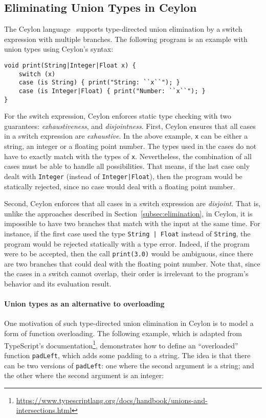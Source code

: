 \subsection{Eliminating Union Types in Ceylon}

The Ceylon language~\cite{king2013ceylon} supports type-directed union elimination by a
switch expression with multiple branches. The following program is an example
with union types using Ceylon's syntax:

\begin{lstlisting}
void print(String|Integer|Float x) {
	switch (x)
	case (is String) { print("String: ``x``"); }
	case (is Integer|Float) { print("Number: ``x``"); }
}
\end{lstlisting}
%

For the switch expression, Ceylon enforces static type checking with two
guarantees: \textit{exhaustiveness}, and \textit{disjointness}. First, Ceylon
ensures that all cases in a switch expression are \textit{exhaustive}. In the above
example, \lstinline{x} can be either a string, an integer or a floating point
number. The types used in the cases do not have to exactly match with the types
of \lstinline{x}. Nevertheless, the combination of all cases must be able to
handle all possibilities. That means, if the last case only dealt with
\lstinline{Integer} (instead of \lstinline{Integer|Float}), then the program
would be statically rejected, since no case would deal with a floating point
number.

Second, Ceylon enforces that all cases in a switch expression are
\textit{disjoint}. That is, unlike the approaches described in
Section~\ref{subsec:elimination}, in Ceylon, it is impossible to have two
branches that match with the input at the same time. For instance, if the first
case used the type \lstinline{String | Float} instead of \lstinline{String}, the
program would be rejected statically with a type error. Indeed, if the program
were to be accepted, then the call \lstinline{print(3.0)} would be ambiguous,
since there are two branches that could deal with the floating point number. Note that, since
the cases in a switch cannot overlap, their order is irrelevant to the program's
behavior and its evaluation result.

\paragraph{Union types as an alternative to overloading}
One motivation of such type-directed union elimination in Ceylon is to
model a form of function overloading.
The following example, which is adapted from TypeScript's documentation\footnote{\url{https://www.typescriptlang.org/docs/handbook/unions-and-intersections.html}},
demonstrates how to define an ``overloaded'' function \lstinline{padLeft},
which adds some padding to a string. The idea is that there can be two versions
of \lstinline{padLeft}: one where the second argument is a string; and
the other where the second argument is an integer:


